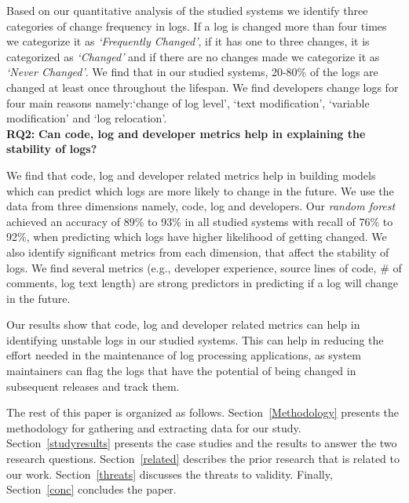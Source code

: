 Based on our quantitative analysis of the studied systems we identify three categories of change frequency in logs. If a log is changed more than four times we categorize it as \textsl{`Frequently Changed'}, if it has one to three changes, it is categorized as \textsl{`Changed'} and if there are no changes made we categorize it as \textsl{`Never Changed'}. We find that in our studied systems, 20-80\% of the logs are changed at least once throughout the lifespan. We find developers change logs for four main reasons namely:`change of log level', `text modification', `variable modification' and `log relocation'.\\ 



\textbf{RQ2:} \textbf{Can code, log and developer metrics help in explaining the stability of logs?}

 We find that code, log and developer related metrics help in building models which can predict which logs are more likely to change in the future. We use the data from three dimensions namely, code, log and developers. Our \textsl{random forest} achieved an accuracy of 89\% to 93\% in all studied systems with recall of 76\% to 92\%, when predicting which logs have higher likelihood of getting changed. We also identify significant metrics from each dimension, that affect the stability of logs. We find several metrics (e.g., developer experience, source lines of code, \# of comments, log text length) are strong predictors in predicting if a log will change in the future. 
 
 
 Our results show that code, log and developer related metrics can help in identifying unstable logs in our studied systems. This can help in reducing the effort needed in the maintenance of log processing applications, as system maintainers can flag the logs that have the potential of being changed in subsequent releases and track them. 
 
The rest of this paper is organized as follows. Section~\ref{Methodology} presents the methodology for gathering and extracting data for our study. Section~\ref{studyresults} presents the case studies and the results to answer the two research questions. Section~\ref{related} describes the prior research that is related to our work. Section~\ref{threats} discusses the threats to validity. Finally, Section~\ref{conc} concludes the paper.
 
 
